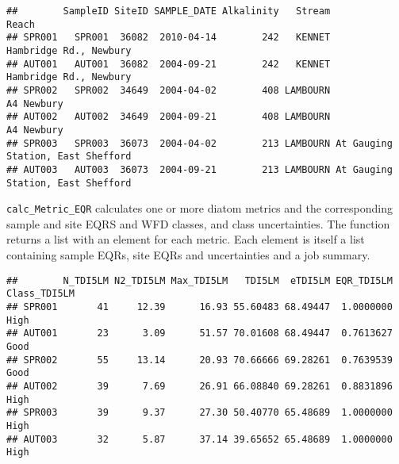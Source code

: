 \documentclass[
]{article}
\newenvironment{Shaded}{\begin{snugshade}}{\end{snugshade}}
\newcommand{\DataTypeTok}[1]{\textcolor[rgb]{0.13,0.29,0.53}{#1}}
\newcommand{\DecValTok}[1]{\textcolor[rgb]{0.00,0.00,0.81}{#1}}
\newcommand{\KeywordTok}[1]{\textcolor[rgb]{0.13,0.29,0.53}{\textbf{#1}}}
\newcommand{\NormalTok}[1]{#1}
\newcommand{\OperatorTok}[1]{\textcolor[rgb]{0.81,0.36,0.00}{\textbf{#1}}}
\newcommand{\StringTok}[1]{\textcolor[rgb]{0.31,0.60,0.02}{#1}}
\begin{document}
\begin{verbatim}
##        SampleID SiteID SAMPLE_DATE Alkalinity   Stream                             Reach
## SPR001   SPR001  36082  2010-04-14        242   KENNET            Hambridge Rd., Newbury
## AUT001   AUT001  36082  2004-09-21        242   KENNET            Hambridge Rd., Newbury
## SPR002   SPR002  34649  2004-04-02        408 LAMBOURN                        A4 Newbury
## AUT002   AUT002  34649  2004-09-21        408 LAMBOURN                        A4 Newbury
## SPR003   SPR003  36073  2004-04-02        213 LAMBOURN At Gauging Station, East Shefford
## AUT003   AUT003  36073  2004-09-21        213 LAMBOURN At Gauging Station, East Shefford
\end{verbatim}

\texttt{calc\_Metric\_EQR} calculates one or more diatom metrics and the
corresponding sample and site EQRS and WFD classes, and class
uncertainties. The function returns a list with an element for each
metric. Each element is itself a list containing sample EQRs, site EQRs
and uncertainties and a job summary.

\begin{Shaded}
\end{Shaded}

\begin{verbatim}
##        N_TDI5LM N2_TDI5LM Max_TDI5LM   TDI5LM  eTDI5LM EQR_TDI5LM Class_TDI5LM
## SPR001       41     12.39      16.93 55.60483 68.49447  1.0000000         High
## AUT001       23      3.09      51.57 70.01608 68.49447  0.7613627         Good
## SPR002       55     13.14      20.93 70.66666 69.28261  0.7639539         Good
## AUT002       39      7.69      26.91 66.08840 69.28261  0.8831896         High
## SPR003       39      9.37      27.30 50.40770 65.48689  1.0000000         High
## AUT003       32      5.87      37.14 39.65652 65.48689  1.0000000         High
\end{verbatim}
\end{document}
